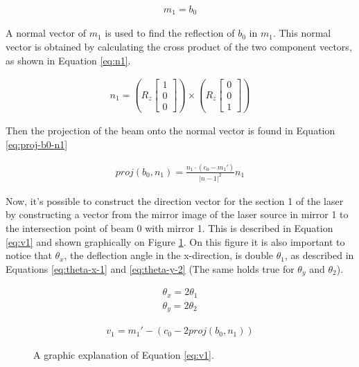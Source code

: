 \begin{align}
    m_1 = b_0
    \label{eq:m1int}
\end{align}

A normal vector of $m_1$ is used to find the reflection of $b_0$ in $m_1$. This normal vector is obtained by calculating the cross product of the two component vectors, as shown in Equation \ref{eq:n1}.

\begin{align}
    n_1 = \left( R_z
    \begin{bmatrix}
        1 \\
        0 \\
        0
    \end{bmatrix} \right)
    \times
    \left( R_z
    \begin{bmatrix}
        0 \\
        0 \\
        1
    \end{bmatrix} \right)
    \label{eq:n1}
\end{align}

Then the projection of the beam onto the normal vector is found in Equation \ref{eq:proj-b0-n1}

\begin{align}
    proj(b_0, n_1) = \frac{n_1 \cdot (c_0 - m_1')}{|n-1|^2} n_1 \label{eq:proj-b0-n1}
\end{align}

Now, it's possible to construct the direction vector for the section 1 of the laser by constructing a vector from the mirror image of the laser source in mirror 1 to the intersection point of beam 0 with mirror 1. This is described in Equation \ref{eq:v1} and shown graphically on Figure \ref{fig:v1}. On this figure it is also important to notice that $\theta_x$, the deflection angle in the x-direction, is double $\theta_1$, as described in Equations \ref{eq:theta-x-1} and \ref{eq:theta-y-2} (The same holds true for $\theta_y$ and $\theta_2$).

\begin{align}
    \theta_x = 2\theta_1 \label{eq:theta-x-1}\\
    \theta_y = 2\theta_2 \label{eq:theta-y-2}
\end{align}

\begin{align}
    v_1 = m_1' - (c_0 - 2proj(b_0, n_1))
    \label{eq:v1}
\end{align}

\begin{figure}[t]
    \centering
    
    \caption{A graphic explanation of Equation \ref{eq:v1}.}
    \label{fig:v1}
\end{figure}

